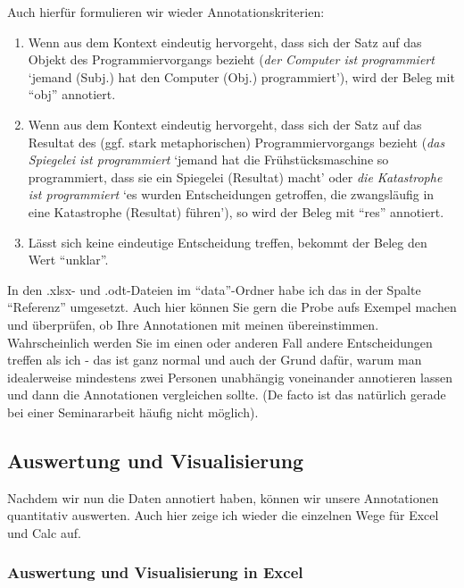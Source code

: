 \documentclass[]{article}
\begin{document}
Auch hierfür formulieren wir wieder Annotationskriterien:

\begin{enumerate}
\def\labelenumi{\arabic{enumi}.}
\item
  Wenn aus dem Kontext eindeutig hervorgeht, dass sich der Satz auf das
  Objekt des Programmiervorgangs bezieht (\emph{der Computer ist
  programmiert} `jemand (Subj.) hat den Computer (Obj.) programmiert'),
  wird der Beleg mit ``obj'' annotiert.
\item
  Wenn aus dem Kontext eindeutig hervorgeht, dass sich der Satz auf das
  Resultat des (ggf. stark metaphorischen) Programmiervorgangs bezieht
  (\emph{das Spiegelei ist programmiert} `jemand hat die
  Frühstücksmaschine so programmiert, dass sie ein Spiegelei (Resultat)
  macht' oder \emph{die Katastrophe ist programmiert} `es wurden
  Entscheidungen getroffen, die zwangsläufig in eine Katastrophe
  (Resultat) führen'), so wird der Beleg mit ``res'' annotiert.
\item
  Lässt sich keine eindeutige Entscheidung treffen, bekommt der Beleg
  den Wert ``unklar''.
\end{enumerate}

In den .xlsx- und .odt-Dateien im ``data''-Ordner habe ich das in der
Spalte ``Referenz'' umgesetzt. Auch hier können Sie gern die Probe aufs
Exempel machen und überprüfen, ob Ihre Annotationen mit meinen
übereinstimmen. Wahrscheinlich werden Sie im einen oder anderen Fall
andere Entscheidungen treffen als ich - das ist ganz normal und auch der
Grund dafür, warum man idealerweise mindestens zwei Personen unabhängig
voneinander annotieren lassen und dann die Annotationen vergleichen
sollte. (De facto ist das natürlich gerade bei einer Seminararbeit
häufig nicht möglich).

\subsection{Auswertung und
Visualisierung}\label{auswertung-und-visualisierung}

Nachdem wir nun die Daten annotiert haben, können wir unsere
Annotationen quantitativ auswerten. Auch hier zeige ich wieder die
einzelnen Wege für Excel und Calc auf.

\subsubsection{Auswertung und Visualisierung in
Excel}\label{auswertung-und-visualisierung-in-excel}
\end{document}
